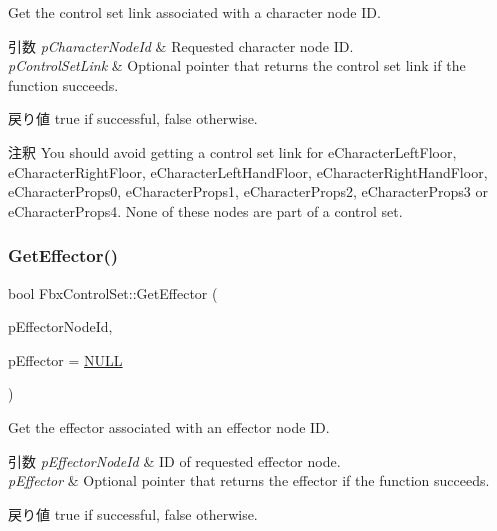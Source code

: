 Get the control set link associated with a character node ID. 
\begin{DoxyParams}{引数}
{\em p\+Character\+Node\+Id} & Requested character node ID. \\
\hline
{\em p\+Control\+Set\+Link} & Optional pointer that returns the control set link if the function succeeds. \\
\hline
\end{DoxyParams}
\begin{DoxyReturn}{戻り値}
{\ttfamily true} if successful, {\ttfamily false} otherwise. 
\end{DoxyReturn}
\begin{DoxyRemark}{注釈}
You should avoid getting a control set link for e\+Character\+Left\+Floor, e\+Character\+Right\+Floor, e\+Character\+Left\+Hand\+Floor, e\+Character\+Right\+Hand\+Floor, e\+Character\+Props0, e\+Character\+Props1, e\+Character\+Props2, e\+Character\+Props3 or e\+Character\+Props4. None of these nodes are part of a control set. 
\end{DoxyRemark}
\mbox{\label{class_fbx_control_set_a9783b07eedcb540aff19bf6037070d5e}} 
\subsubsection{\texorpdfstring{Get\+Effector()}{GetEffector()}}
{\footnotesize\ttfamily bool Fbx\+Control\+Set\+::\+Get\+Effector (\begin{DoxyParamCaption}\item[{\hyperlink{class_fbx_effector_a26afd81fd3d41431311004c16536e739}{Fbx\+Effector\+::\+E\+Node\+Id}}]{p\+Effector\+Node\+Id,  }\item[{\hyperlink{class_fbx_effector}{Fbx\+Effector} $\ast$}]{p\+Effector = {\ttfamily \hyperlink{fbxarch_8h_a070d2ce7b6bb7e5c05602aa8c308d0c4}{N\+U\+LL}} }\end{DoxyParamCaption})}

Get the effector associated with an effector node ID. 
\begin{DoxyParams}{引数}
{\em p\+Effector\+Node\+Id} & ID of requested effector node. \\
\hline
{\em p\+Effector} & Optional pointer that returns the effector if the function succeeds. \\
\hline
\end{DoxyParams}
\begin{DoxyReturn}{戻り値}
{\ttfamily true} if successful, {\ttfamily false} otherwise. 
\end{DoxyReturn}
\mbox{\label{class_fbx_control_set_a08c533d159db683fc835de93b26fd111}} 
